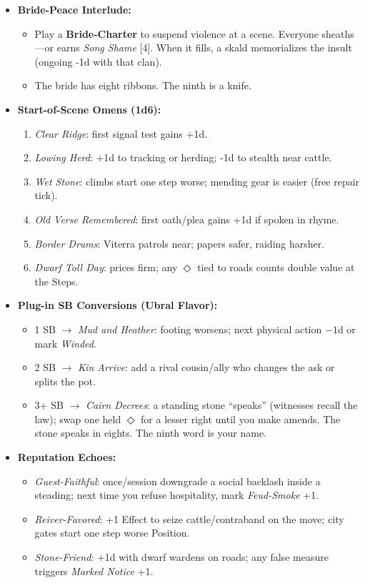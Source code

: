\begin{itemize}
  \item \textbf{Bride-Peace Interlude:}
  \begin{itemize}
    \item Play a \textbf{Bride-Charter} to suspend violence at a scene. Everyone sheaths---or earns \emph{Song Shame} [4]. When it fills, a skald memorializes the insult (ongoing -1d with that clan).
    \item The bride has eight ribbons. The ninth is a knife.
  \end{itemize}

  \item \textbf{Start-of-Scene Omens (1d6):}
  \begin{enumerate}
    \item \emph{Clear Ridge}: first signal test gains +1d.
    \item \emph{Lowing Herd}: +1d to tracking or herding; -1d to stealth near cattle.
    \item \emph{Wet Stone}: climbs start one step worse; mending gear is easier (free repair tick).
    \item \emph{Old Verse Remembered}: first oath/plea gains +1d if spoken in rhyme.
    \item \emph{Border Drums}: Viterra patrols near; papers safer, raiding harsher.
    \item \emph{Dwarf Toll Day}: prices firm; any \(\Diamond\) tied to roads counts double value at the Steps.
  \end{enumerate}

  \item \textbf{Plug-in SB Conversions (Ubral Flavor):}
  \begin{itemize}
    \item 1 SB \(\rightarrow\) \emph{Mud and Heather}: footing worsens; next physical action \(-1\)d or mark \emph{Winded}.
    \item 2 SB \(\rightarrow\) \emph{Kin Arrive}: add a rival cousin/ally who changes the ask or splits the pot.
    \item 3+ SB \(\rightarrow\) \emph{Cairn Decrees}: a standing stone ``speaks'' (witnesses recall the law); swap one held \(\Diamond\) for a lesser right until you make amends. The stone speaks in eights. The ninth word is your name.
  \end{itemize}

  \item \textbf{Reputation Echoes:}
  \begin{itemize}
    \item \emph{Guest-Faithful}: once/session downgrade a social backlash inside a steading; next time you refuse hospitality, mark \emph{Feud-Smoke} +1.
    \item \emph{Reiver-Favored}: +1 Effect to seize cattle/contraband on the move; city gates start one step worse Position.
    \item \emph{Stone-Friend}: +1d with dwarf wardens on roads; any false measure triggers \emph{Marked Notice} +1.
  \end{itemize}
\end{itemize}

